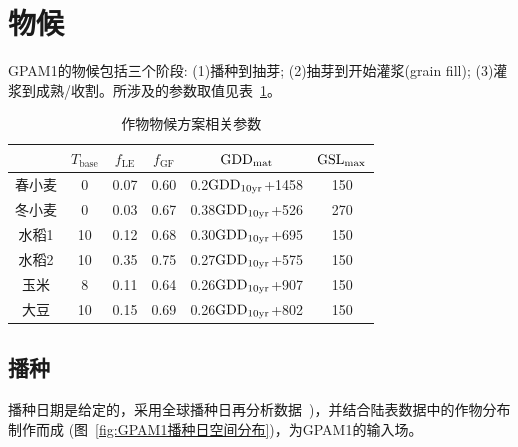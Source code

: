 \section{物候}
GPAM1的物候包括三个阶段: (1)播种到抽芽; (2)抽芽到开始灌浆(grain fill); (3)灌浆到成熟/收割。所涉及的参数取值见表~\ref{tab:作物物候方案相关参数}。

\begin{table}[htbp]
  \centering
  \caption{作物物候方案相关参数}
  \label{tab:作物物候方案相关参数}
  \begin{tabular}{@{}cccccc@{}}
    \toprule
           & $T_{\mathrm{base}}$ & $f_{\mathrm{LE}}$ & $f_{\mathrm{GF}}$ & ${\rm GDD}_{\mathrm{mat}}$  & ${\rm GSL}_{\mathrm{max}}$ \\ \midrule
    春小麦 & 0                   & 0.07              & 0.60              & 0.2${\rm GDD}_{\rm 10yr}$+1458  & 150                  \\
    冬小麦 & 0                   & 0.03              & 0.67              & 0.38${\rm GDD}_{\rm 10yr}$+526  & 270                  \\
    水稻1  & 10                  & 0.12              & 0.68              & 0.30${\rm GDD}_{\rm 10yr}$+695  & 150                  \\
    水稻2  & 10                  & 0.35              & 0.75              & 0.27${\rm GDD}_{\rm 10yr}$+575  & 150                  \\
    玉米   & 8                   & 0.11              & 0.64              & 0.26${\rm GDD}_{\rm 10yr}$+907 & 150                  \\
    大豆   & 10                  & 0.15              & 0.69              & 0.26${\rm GDD}_{\rm 10yr}$+802  & 150                  \\ \bottomrule
  \end{tabular}
\end{table}

\subsection{播种}\label{sec:播种}
  播种日期是给定的，采用全球播种日再分析数据~\citep{jagermeyr2021climate})，并结合陆表数据中的作物分布制作而成 (图~\ref{fig:GPAM1播种日空间分布})，为GPAM1的输入场。

